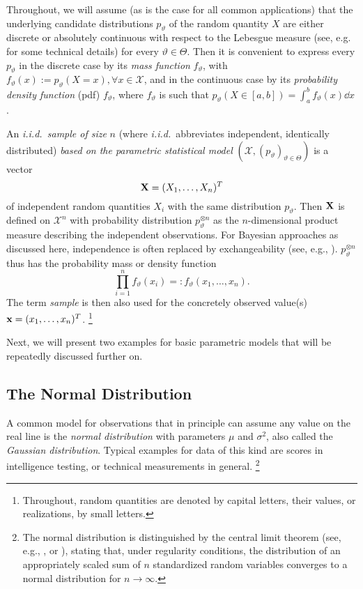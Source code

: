 Throughout, we will assume (as is the case for all common applications)
that the underlying candidate distributions $p_\vartheta$ of the random quantity $X$
are either discrete or absolutely continuous with respect to the Lebesgue measure
(see, e.g. \cite[pp.~32f, 38]{1993:karr} for some technical details) for every $\vartheta \in \Theta$.
Then it is convenient to express every $p_\vartheta$ in the discrete case by its \emph{mass function} $f_\vartheta$,
with $f_\vartheta(x):=p_\vartheta(X=x),\forall x \in \mathcal{X}$,
and in the continuous case by its \emph{probability density function} (pdf) $f_\vartheta$,
where $f_\vartheta$ is such that $p_\vartheta(X \in [a,b]) = \int_a^b f_\vartheta(x) \dd x$.

An \emph{i.i.d.\ sample of size} $n$ (where \emph{i.i.d.}\ abbreviates independent, identically distributed)
\emph{based on the parametric statistical model} %
$(\mathcal{X}, (p_\vartheta)_{\vartheta \in \Theta})$ is a vector
\[
{\X}=(X_1, \ldots, X_n)^T %
\]
of independent random quantities $X_i$ with the same distribution $p_\vartheta$.
Then $\mathbf{X}$ is defined on $\mathcal{X}^n$ with probability distribution $p_\vartheta^{\otimes n}$
as the $n$-dimensional product measure describing the independent observations.
For Bayesian approaches as discussed here,
independence is often replaced by exchangeability (see, e.g., \cite[\S 4.2]{2000:bernardosmith}).
$p_\vartheta^{\otimes n}$ thus has the probability mass or density function
\[
\prod_{i=1}^{n} f_\vartheta(x_i) =: f_\vartheta(x_1, \ldots, x_n).%
\]
The term \emph{sample} is then also used for the concretely observed value(s) $\mathbf{x}=(x_1, \ldots, x_n)^T$.%
\footnote{Throughout, random quantities are denoted by capital letters, their values, or realizations, by small letters.}

Next, we will present two examples for basic parametric models that will be repeatedly discussed further on.


\subsection{The Normal Distribution}
\label{sec:normaldist}

A common model for observations that in principle can assume any value on the real line
is the \emph{normal distribution} with parameters $\mu$ and $\sigma^2$, also called the \emph{Gaussian distribution}.
Typical examples for data of this kind are scores in intelligence testing, or technical measurements in general.%
\footnote{The normal distribution is distinguished by the central limit theorem
(see, e.g., \cite[\S 7.3]{1993:karr}, or \cite[\S 9]{1968:breiman}), stating that, under regularity conditions,
the distribution of an appropriately scaled sum of $n$ standardized random variables converges to a normal distribution
for $n \longrightarrow \infty$.}

